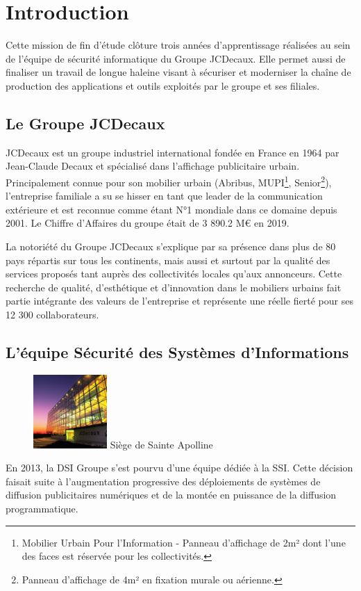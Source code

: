\chapter{Introduction}

Cette mission de fin d'étude clôture trois années d'apprentissage réalisées au sein de l'équipe de sécurité informatique 
du Groupe JCDecaux. Elle permet aussi de finaliser un travail de longue haleine visant à sécuriser et moderniser
la chaîne de production des applications et outils exploités par le groupe et ses filiales.

\section{Le Groupe JCDecaux}
JCDecaux est un groupe industriel international fondée en France en 1964 par Jean-Claude Decaux et spécialisé dans 
l'affichage publicitaire urbain. Principalement connue pour son mobilier urbain (Abribus, MUPI\footnote{Mobilier Urbain 
Pour l'Information - Panneau d'affichage de 2m² dont l'une des faces est réservée pour les collectivités.}, Senior\footnote{
Panneau d'affichage de 4m² en fixation murale ou aérienne.}), l'entreprise familiale a su se hisser en tant que leader de 
la communication extérieure et est reconnue comme étant N°1 mondiale dans ce domaine depuis 2001. Le Chiffre d'Affaires du 
groupe était de 3 890.2 M€ en 2019.

La notoriété du Groupe JCDecaux s'explique par sa présence dans plus de 80 pays répartis sur tous les continents, mais
aussi et surtout par la qualité des services proposés tant auprès des collectivités locales qu'aux annonceurs.
Cette recherche de qualité, d'esthétique et d'innovation dans le mobiliers urbains fait partie intégrante des valeurs de 
l'entreprise et représente une réelle fierté pour ses 12 300 collaborateurs. 

\section{L'équipe Sécurité des Systèmes d'Informations}
\begin{figure} 
    \centering \includegraphics[width=0.25\textwidth]{resources/img/jcd_pla_front.jpg}
    \centering Siège de Sainte Apolline
\end{figure}
En 2013, la \ac{DSI} Groupe s'est pourvu d'une équipe dédiée à la \ac{SSI}.
Cette décision faisait suite à l'augmentation progressive des déploiements de systèmes de diffusion publicitaires numériques et
de la montée en puissance de la diffusion programmatique.

